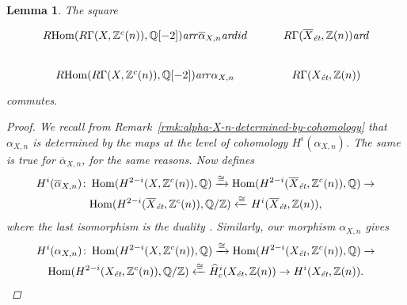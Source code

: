 \documentclass[leqno,12pt]{article}
\theoremstyle{plain}
\newtheorem{lemma}[theorem]{\indent\sc Lemma}
\theoremstyle{definition}
\DeclareMathOperator{\Hom}{Hom}
\newcommand{\QQ}{\mathbb{Q}}
\newcommand{\ZZ}{\mathbb{Z}}
\newcommand{\ar}{\text{\it ar}}
\newcommand{\et}{\text{\it \'{e}t}}
\newcommand{\RHom}{R\!\Hom}
\begin{document}
\begin{lemma}
  The square
  \begin{equation}
    \label{eqn:alpha-vs-alpha-bar-square}
    \begin{tikzcd}
      \RHom (R\Gamma (X, \ZZ^c (n)), \QQ [-2]) \ar{r}{\overline{\alpha}_{X,n}}\ar{d}{id} & R\Gamma (\overline{X}_\et, \ZZ(n))\ar{d} \\
      \RHom (R\Gamma (X, \ZZ^c (n)), \QQ [-2]) \ar{r}{\alpha_{X,n}} & R\Gamma (X_\et, \ZZ(n))
    \end{tikzcd}
  \end{equation}
  commutes.

  \begin{proof}
    We recall from Remark~\ref{rmk:alpha-X-n-determined-by-cohomology} that
    $\alpha_{X,n}$ is determined by the maps at the level of cohomology
    $H^i (\alpha_{X,n})$. The same is true for $\overline{\alpha}_{X,n}$, for
    the same reasons. Now \cite[Theorem~3.5]{Flach-Morin-2018} defines
    \begin{multline*}
      H^i (\overline{\alpha}_{X,n})\colon
      \Hom (H^{2-i} (X, \ZZ^c (n)), \QQ) \xrightarrow{\cong}
      \Hom (H^{2-i} (\overline{X}_\et, \ZZ^c (n)), \QQ) \to \\
      \Hom (H^{2-i} (\overline{X}_\et, \ZZ^c (n)), \QQ/\ZZ) \xleftarrow{\cong}
      H^i (\overline{X}_\et, \ZZ (n)),
    \end{multline*}
    where the last isomorphism is the duality
    \cite[Corollary~6.26]{Flach-Morin-2018}. Similarly, our morphism
    $\alpha_{X,n}$ gives
    \begin{multline*}
      H^i (\alpha_{X,n})\colon
      \Hom (H^{2-i} (X, \ZZ^c (n)), \QQ) \xrightarrow{\cong}
      \Hom (H^{2-i} (X_\et, \ZZ^c (n)), \QQ) \to \\
      \Hom (H^{2-i} (X_\et, \ZZ^c (n)), \QQ/\ZZ) \xleftarrow{\cong}
      \widehat{H}^i_c (X_\et, \ZZ (n)) \to
      H^i (X_\et, \ZZ (n)).
    \end{multline*}


\end{proof}
\end{lemma}
\end{document}
